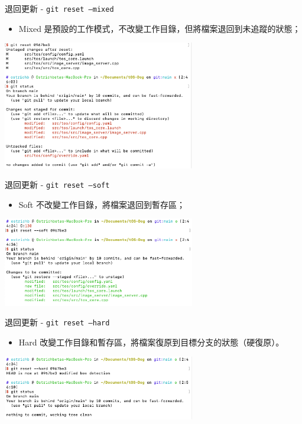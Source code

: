 \documentclass[xetex, unicode, 10pt, aspectratio=169]{beamer}
\begin{document}
\begin{frame}{退回更新 - \texttt{git reset --mixed}}
    \begin{itemize}
        \item Mixed 是預設的工作模式，不改變工作目錄，但將檔案退回到未追蹤的狀態；
    \end{itemize}
    \begin{center}
        \includegraphics[width=3.3in]{./img/git-reset-mixed.png}
    \end{center}
\end{frame}

\begin{frame}{退回更新 - \texttt{git reset --soft}}
    \begin{itemize}
        \item Soft 不改變工作目錄，將檔案退回到暫存區；
    \end{itemize}
    \begin{center}
        \includegraphics[width=3.3in]{./img/git-reset-soft.png}
    \end{center}
\end{frame}

\begin{frame}{退回更新 - \texttt{git reset --hard}}
    \begin{itemize}
        \item Hard 改變工作目錄和暫存區，將檔案復原到目標分支的狀態（硬復原）。
    \end{itemize}
    \begin{center}
        \includegraphics[width=3.3in]{./img/git-reset-hard.png}
    \end{center}
\end{frame}
\end{document}
